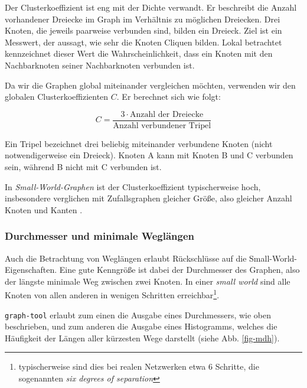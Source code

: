 \documentclass[11pt, a4paper]{article}
\begin{document}
Der Clusterkoeffizient ist eng mit der Dichte verwandt. Er beschreibt die
Anzahl vorhandener Dreiecke im Graph im Verhältnis zu möglichen Dreiecken. Drei
Knoten, die jeweils paarweise verbunden sind, bilden ein Dreieck. Ziel ist ein
Messwert, der aussagt, wie sehr die Knoten Cliquen bilden. Lokal betrachtet
kennzeichnet dieser Wert die Wahrscheinlichkeit, dass ein Knoten mit den
Nachbarknoten seiner Nachbarknoten verbunden ist.

Da wir die Graphen global miteinander vergleichen möchten, verwenden wir den
globalen Clusterkoeffizienten $C$. Er berechnet sich wie folgt:

$$
    C = \frac{3\cdot\text{Anzahl der Dreiecke}}{\text{Anzahl verbundener Tripel}}
$$

Ein Tripel bezeichnet drei beliebig miteinander verbundene Knoten (nicht
notwendigerweise ein Dreieck). Knoten A kann mit Knoten B und C verbunden sein,
während B nicht mit C verbunden ist.

In \emph{Small-World-Graphen} ist der Clusterkoeffizient typischerweise hoch, 
insbesondere verglichen mit Zufallsgraphen gleicher Größe, also gleicher Anzahl
Knoten und Kanten \cite{Newman2003}.


\subsubsection{Durchmesser und minimale Wegl\"angen}

Auch die Betrachtung von Weglängen erlaubt Rückschlüsse auf die Small-World-Eigenschaften.
Eine gute Kenngröße ist dabei der Durchmesser
des Graphen, also der längste minimale Weg zwischen zwei Knoten. In einer
\emph{small world} sind alle Knoten von allen anderen in wenigen Schritten
erreichbar\footnote{typischerweise sind dies bei realen Netzwerken etwa 6 Schritte, die sogenannten 
\emph{six degrees of separation}\cite{Newman2003}}.

\texttt{graph-tool} erlaubt zum einen die Ausgabe eines Durchmessers, wie oben
beschrieben, und zum anderen die Ausgabe eines Histogramms, welches die 
Häufigkeit der Längen aller kürzesten Wege darstellt (siehe Abb. \ref{fig-mdh}).
\end{document}
